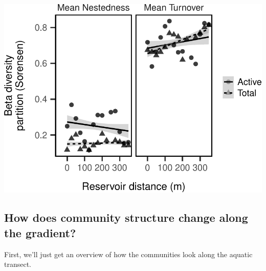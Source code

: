 \documentclass[]{article}
\begin{document}
\begin{center}\includegraphics{ReservoirGradient_files/figure-latex/unnamed-chunk-3-2} \end{center}

\hypertarget{how-does-community-structure-change-along-the-gradient}{%
\subsection{How does community structure change along the
gradient?}\label{how-does-community-structure-change-along-the-gradient}}

First, we'll just get an overview of how the communities look along the
aquatic transect.
\end{document}
